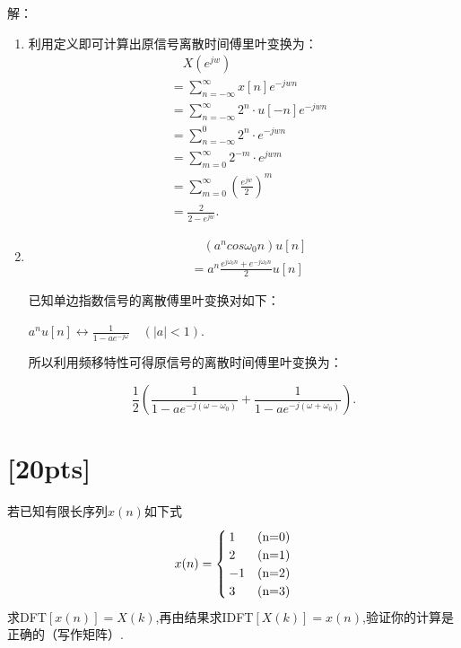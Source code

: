 \documentclass[a4paper,UTF8]{article}
\numberwithin{equation}{section}
\begin{document}
\begin{framed}
	解：
     \begin{enumerate}[(1)]
    	\item 
    	利用定义即可计算出原信号离散时间傅里叶变换为：
    	\begin{align*}
    		&\quad X(e^{jw}) \\
    		&= \sum\limits_{n = -\infty}^{\infty}x[n]e^{-jwn}\\
    		&= \sum\limits_{n = -\infty}^{\infty}2^n\cdot u[-n] e^{-jwn}\\
    		&= \sum\limits_{n = -\infty}^{0}2^n\cdot e^{-jwn}\\
    		&= \sum\limits_{m = 0}^{\infty}2^{-m}\cdot e^{jwm}\\
    		&= \sum\limits_{m = 0}^{\infty}{(\frac{e^{jw}}{2})}^m\\
    		&= \frac{2}{2-e^{jw}}.
    	\end{align*}
    	
    	\item
    	\begin{align*}
    		&\quad (a^ncos\omega_0n)u[n] \\
    		&= a^n \frac{e^{j\omega_0n} + e^{-j\omega_0n}}{2}u[n]
    	\end{align*}
    	
    	已知单边指数信号的离散傅里叶变换对如下：
    	
    	$a^nu[n]  \leftrightarrow \frac{1}{1-ae^{-j\omega}} \quad(|a| < 1)$.
    	
    	所以利用频移特性可得原信号的离散时间傅里叶变换为：
    	
    	\[\frac{1}{2}(\frac{1}{1-ae^{-j(\omega-\omega_0)}} + \frac{1}{1-ae^{-j(\omega+\omega_0)}}).\]
    	
    \end{enumerate}
\end{framed}





\newpage
\section{[20pts]}
若已知有限长序列$x(n)$如下式
\begin{equation}
x(n) = \begin{cases}
1 & $(n=0)$ \\
2 & $(n=1)$ \\
-1 & $(n=2)$ \\
3 & $(n=3)$
\end{cases}
\end{equation}
求DFT$[x(n)]=X(k)$,再由结果求IDFT$[X(k)]=x(n)$,验证你的计算是正确的（写作矩阵）.
\end{document}
